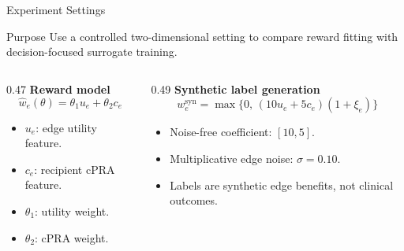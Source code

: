 \documentclass[aspectratio=169]{beamer}
\begin{document}
\begin{frame}{Experiment Settings}
  \small
  \begin{block}{Purpose}
    Use a controlled two-dimensional setting to compare reward fitting with
    decision-focused surrogate training.
  \end{block}

  \vspace{0.45em}
  \begin{columns}[T,onlytextwidth]
    \begin{column}{0.47\textwidth}
      \textbf{Reward model}
      \[
        \hat w_e(\theta)=\theta_1 u_e+\theta_2 c_e
      \]
      \begin{itemize}\setlength{\itemsep}{0.45em}
        \item \(u_e\): edge utility feature.
        \item \(c_e\): recipient cPRA feature.
        \item \(\theta_1\): utility weight.
        \item \(\theta_2\): cPRA weight.
      \end{itemize}
    \end{column}
    \begin{column}{0.49\textwidth}
      \textbf{Synthetic label generation}
      \[
        w^{\mathrm{syn}}_e
        =
        \max\{0,\,(10u_e+5c_e)(1+\xi_e)\}
      \]
      \begin{itemize}\setlength{\itemsep}{0.45em}
        \item Noise-free coefficient: \([10,5]\).
        \item Multiplicative edge noise: \(\sigma=0.10\).
        \item Labels are synthetic edge benefits, not clinical outcomes.
      \end{itemize}
    \end{column}
  \end{columns}
\end{frame}
\end{document}
